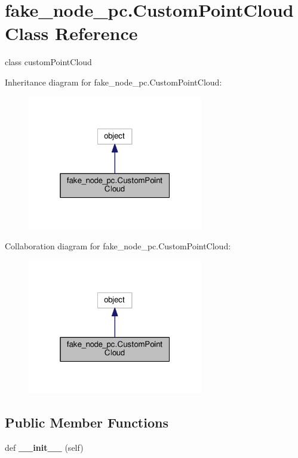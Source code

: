 \hypertarget{classfake__node__pc_1_1CustomPointCloud}{}\section{fake\+\_\+node\+\_\+pc.\+Custom\+Point\+Cloud Class Reference}
\label{classfake__node__pc_1_1CustomPointCloud}


class custom\+Point\+Cloud  




Inheritance diagram for fake\+\_\+node\+\_\+pc.\+Custom\+Point\+Cloud\+:
\nopagebreak
\begin{figure}[H]
\begin{center}
\leavevmode
\includegraphics[width=217pt]{classfake__node__pc_1_1CustomPointCloud__inherit__graph}
\end{center}
\end{figure}


Collaboration diagram for fake\+\_\+node\+\_\+pc.\+Custom\+Point\+Cloud\+:
\nopagebreak
\begin{figure}[H]
\begin{center}
\leavevmode
\includegraphics[width=217pt]{classfake__node__pc_1_1CustomPointCloud__coll__graph}
\end{center}
\end{figure}
\subsection*{Public Member Functions}
\begin{DoxyCompactItemize}
\item 
def {\bfseries \+\_\+\+\_\+init\+\_\+\+\_\+} (self)\hypertarget{classfake__node__pc_1_1CustomPointCloud_a9a10f269e06529110e89a3a5955cf133}{}\label{classfake__node__pc_1_1CustomPointCloud_a9a10f269e06529110e89a3a5955cf133}

\end{DoxyCompactItemize}
